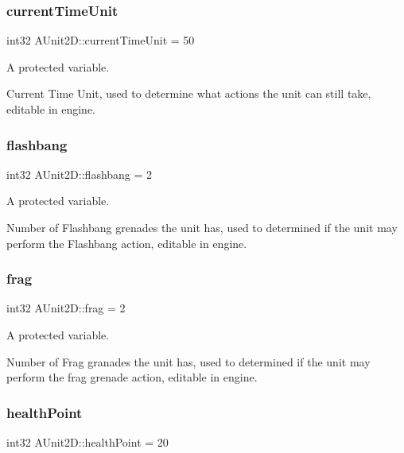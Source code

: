 \subsubsection{\texorpdfstring{current\+Time\+Unit}{currentTimeUnit}}
{\footnotesize\ttfamily int32 A\+Unit2\+D\+::current\+Time\+Unit = 50\hspace{0.3cm}{\ttfamily [protected]}}



A protected variable. 

Current Time Unit, used to determine what actions the unit can still take, editable in engine. \hypertarget{class_a_unit2_d_a898e4c6cf4c37c9a1b84d73a7fb30c6b}{}\label{class_a_unit2_d_a898e4c6cf4c37c9a1b84d73a7fb30c6b} 
\subsubsection{\texorpdfstring{flashbang}{flashbang}}
{\footnotesize\ttfamily int32 A\+Unit2\+D\+::flashbang = 2\hspace{0.3cm}{\ttfamily [protected]}}



A protected variable. 

Number of Flashbang grenades the unit has, used to determined if the unit may perform the Flashbang action, editable in engine. \hypertarget{class_a_unit2_d_ad2d855d2c78d2e1918b84df6ae4da192}{}\label{class_a_unit2_d_ad2d855d2c78d2e1918b84df6ae4da192} 
\subsubsection{\texorpdfstring{frag}{frag}}
{\footnotesize\ttfamily int32 A\+Unit2\+D\+::frag = 2\hspace{0.3cm}{\ttfamily [protected]}}



A protected variable. 

Number of Frag granades the unit has, used to determined if the unit may perform the frag grenade action, editable in engine. \hypertarget{class_a_unit2_d_a251c25f80c0fe087b892d82baf8cfa0d}{}\label{class_a_unit2_d_a251c25f80c0fe087b892d82baf8cfa0d} 
\subsubsection{\texorpdfstring{health\+Point}{healthPoint}}
{\footnotesize\ttfamily int32 A\+Unit2\+D\+::health\+Point = 20\hspace{0.3cm}{\ttfamily [protected]}}



